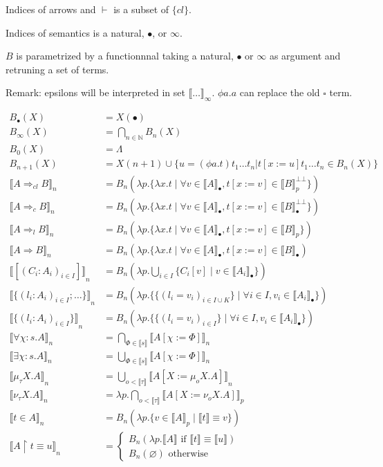 \documentclass[oneside,a4]{book}
\renewcommand{\emptyset}{\varnothing}
\newcommand{\N}{\mathbb{N}}
\newcommand{\sem}[1]{\ensuremath{\llbracket #1 \rrbracket}}
\begin{document}
Indices of arrows and $\vdash$ is a subset of $\{cl\}$.

Indices of semantics is a natural, $\bullet$, or $\infty$.

$B$ is parametrized by a functionnnal taking  a natural, $\bullet$
or $\infty$ as argument and retruning a set of terms.

Remark: epsilons will be interpreted in set $\sem{\dots}_\infty$. $\phi a.a$
can replace the old $\square$ term.

  \begin{align*}
    B_\bullet(X) &= X(\bullet)\\
    B_\infty(X)  &= \bigcap_{n \in \N} B_n(X) \\
    B_0(X) &= \Lambda     \\
    B_{n+1}(X) &= X(n+1) \cup \{ u = (\phi a.t) t_1 \dots t_n |
    t[x:=u] t_1 \dots t_n \in B_n(X)\} \\
    \sem{A \Rightarrow_{cl} B}_n &=
      B_n(\lambda p. \{\lambda x.t \;|\; \forall v \in \sem{A}_\bullet,
      t[x := v] \in \sem{B}_p^{\bot\bot}\})\\
    \sem{A \Rightarrow_{c} B}_n &=
      B_n(\lambda p. \{\lambda x.t \;|\; \forall v \in \sem{A}_\bullet,
      t[x := v] \in \sem{B}_\bullet^{\bot\bot}\})\\
    \sem{A \Rightarrow_{l} B}_n &=
      B_n(\lambda p. \{\lambda x.t \;|\; \forall v \in \sem{A}_\bullet,
      t[x := v] \in \sem{B}_p\})\\
    \sem{A \Rightarrow B}_n &=
      B_n(\lambda p. \{\lambda x.t \;|\; \forall v \in \sem{A}_\bullet,
       t[x := v] \in \sem{B}_\bullet)\\
    \sem{[(C_i : A_i)_{i \in I}]}_n
      &=   B_n(\lambda p. \bigcup_{i \in I} \{C_i[v] \;|\; v \in
    \sem{A_i}_\bullet \})\\
    \sem{\{(l_i : A_i)_{i \in I}; \dots\}}_n
      &= B_n(\lambda p. \{\{(l_i = v_i)_{i \in I \cup K}\} \;|\; \forall i \in I, v_i \in \sem{A_i}_\bullet\})\\
    \sem{\{(l_i : A_i)_{i \in I}\}}_n
      &= B_n(\lambda p. \{\{(l_i = v_i)_{i \in I}\} \;|\; \forall i \in I,
    v_i \in \sem{A_i}_\bullet \})\\
    \sem{\forall \chi:s.A}_n
      &= \bigcap_{\Phi \in \sem{s}}
           \sem{A[\chi := \Phi]}_n\\
    \sem{\exists \chi:s.A}_n
      &= \bigcup_{\Phi \in \sem{s}}
           \sem{A[\chi := \Phi]}_n\\
    \sem{\mu_\tau X.A}_n
      &=  \bigcup_{o < \sem{\tau}}
            \sem{A[X := \mu_o X.A]}_n\\
    \sem{\nu_\tau X.A}_n
      &= \lambda p. \bigcap_{o < \sem{\tau}}
            \sem{A[X := \nu_o X.A]}_p\\
    \sem{t \in A}_n
      &= B_n(\lambda p. \{v \in \sem{A}_p \;|\; \sem{t}
      \equiv v\})\\
    \sem{A \restriction t \equiv u}_n
       &= \begin{cases}
           B_n(\lambda p. \sem{A} \text{ if } \sem{t}
             \equiv \sem{u})\\
           B_n(\emptyset) \text{ otherwise}
    \end{cases}
  \end{align*}
\end{document}
